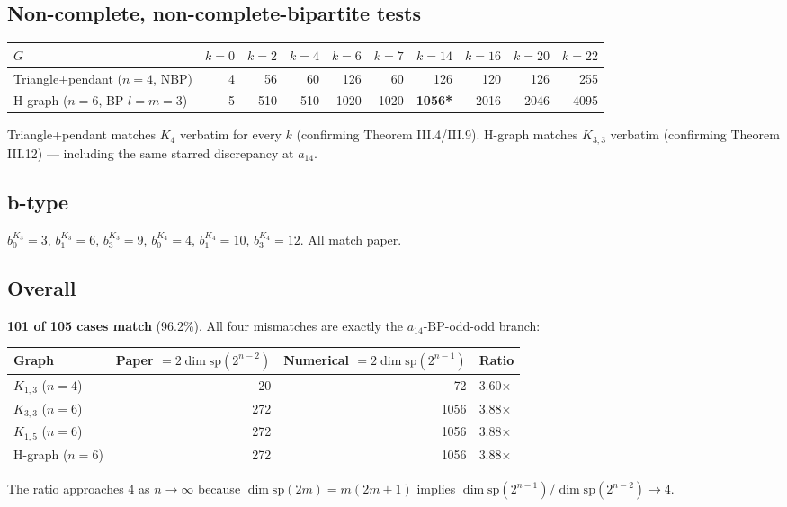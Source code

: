 \documentclass[11pt]{article}
\begin{document}
\subsection{Non-complete, non-complete-bipartite tests}

\begin{center}\small
\begin{tabular}{lrrrrrrrrr}
\toprule
$G$ & $k{=}0$ & $k{=}2$ & $k{=}4$ & $k{=}6$ & $k{=}7$ & $k{=}14$ & $k{=}16$ & $k{=}20$ & $k{=}22$ \\
\midrule
Triangle+pendant ($n{=}4$, NBP) & 4 & 56 & 60 & 126 & 60 & 126 & 120 & 126 & 255 \\
H-graph ($n{=}6$, BP $l{=}m{=}3$) & 5 & 510 & 510 & 1020 & 1020 & \textbf{1056*} & 2016 & 2046 & 4095 \\
\bottomrule
\end{tabular}
\end{center}
Triangle+pendant matches $K_4$ verbatim for every $k$ (confirming Theorem III.4/III.9). H-graph matches $K_{3,3}$ verbatim (confirming Theorem III.12) --- including the same starred discrepancy at $a_{14}$.

\subsection{b-type}

$b_0^{K_3}=3$, $b_1^{K_3}=6$, $b_3^{K_3}=9$, $b_0^{K_4}=4$, $b_1^{K_4}=10$, $b_3^{K_4}=12$. All match paper.

\subsection{Overall}

\textbf{101 of 105 cases match} (96.2\%). All four mismatches are exactly the $a_{14}$-BP-odd-odd branch:
\begin{center}\small
\begin{tabular}{lrrl}
\toprule
Graph & Paper $= 2\dim\mathrm{sp}(2^{n-2})$ & Numerical $= 2\dim\mathrm{sp}(2^{n-1})$ & Ratio \\
\midrule
$K_{1,3}$ ($n{=}4$) & 20 & 72 & 3.60$\times$ \\
$K_{3,3}$ ($n{=}6$) & 272 & 1056 & 3.88$\times$ \\
$K_{1,5}$ ($n{=}6$) & 272 & 1056 & 3.88$\times$ \\
H-graph ($n{=}6$) & 272 & 1056 & 3.88$\times$ \\
\bottomrule
\end{tabular}
\end{center}
The ratio approaches $4$ as $n\to\infty$ because $\dim\mathrm{sp}(2m)=m(2m+1)$ implies $\dim\mathrm{sp}(2^{n-1})/\dim\mathrm{sp}(2^{n-2})\to 4$.
\end{document}
